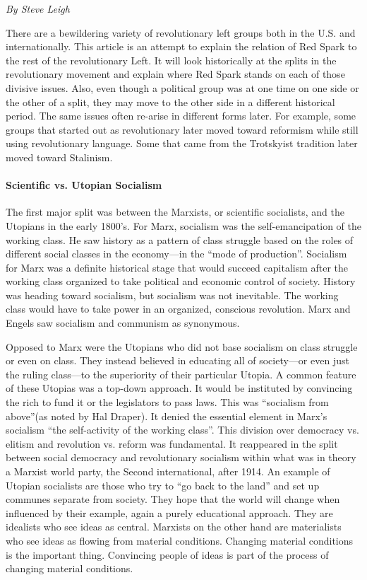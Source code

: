 \emph{By Steve Leigh}

There are a bewildering variety of revolutionary left groups both in the U.S. and internationally. This article is an attempt to explain the relation of Red Spark to the rest of the revolutionary Left. It will look historically at the splits in the revolutionary movement and explain where Red Spark stands on each of those divisive issues. Also, even though a political group was at one time on one side or the other of a split, they may move to the other side in a different historical period. The same issues often re-arise in different forms later. For example, some groups that started out as revolutionary later moved toward reformism while still using revolutionary language. Some that came from the Trotskyist tradition later moved toward Stalinism.

\paragraph{Scientific vs. Utopian Socialism}

The first major split was between the Marxists, or scientific socialists, and the Utopians in the early 1800's. For Marx, socialism was the self-emancipation of the working class. He saw history as a pattern of class struggle based on the roles of different social classes in the economy---in the ``mode of production''. Socialism for Marx was a definite historical stage that would succeed capitalism after the working class organized to take political and economic control of society. History was heading toward socialism, but socialism was not inevitable. The working class would have to take power in an organized, conscious revolution. Marx and Engels saw socialism and communism as synonymous.

Opposed to Marx were the Utopians who did not base socialism on class struggle or even on class. They instead believed in educating all of society---or even just the ruling class---to the superiority of their particular Utopia. A common feature of these Utopias was a top-down approach. It would be instituted by convincing the rich to fund it or the legislators to pass laws. This was ``socialism from above''(as noted by Hal Draper). It denied the essential element in Marx's socialism ``the self-activity of the working class''. This division over democracy vs. elitism and revolution vs. reform was fundamental. It reappeared in the split between social democracy and revolutionary socialism within what was in theory a Marxist world party, the Second international, after 1914. An example of Utopian socialists are those who try to ``go back to the land'' and set up communes separate from society. They hope that the world will change when influenced by their example, again a purely educational approach. They are idealists who see ideas as central. Marxists on the other hand are materialists who see ideas as flowing from material conditions. Changing material conditions is the important thing. Convincing people of ideas is part of the process of changing material conditions.


